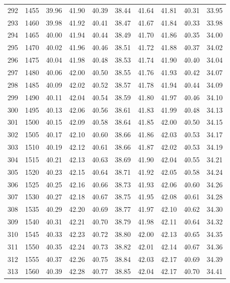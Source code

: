 \begin{longtable}{rrllllllll}
292 & 1455 & 39.96 & 41.90 & 40.39 & 38.44 & 41.64 & 41.81 & 40.31 & 33.95 \\ 
293 & 1460 & 39.98 & 41.92 & 40.41 & 38.47 & 41.67 & 41.84 & 40.33 & 33.98 \\ 
294 & 1465 & 40.00 & 41.94 & 40.44 & 38.49 & 41.70 & 41.86 & 40.35 & 34.00 \\ 
295 & 1470 & 40.02 & 41.96 & 40.46 & 38.51 & 41.72 & 41.88 & 40.37 & 34.02 \\ 
296 & 1475 & 40.04 & 41.98 & 40.48 & 38.53 & 41.74 & 41.90 & 40.40 & 34.04 \\ 
297 & 1480 & 40.06 & 42.00 & 40.50 & 38.55 & 41.76 & 41.93 & 40.42 & 34.07 \\ 
298 & 1485 & 40.09 & 42.02 & 40.52 & 38.57 & 41.78 & 41.94 & 40.44 & 34.09 \\ 
299 & 1490 & 40.11 & 42.04 & 40.54 & 38.59 & 41.80 & 41.97 & 40.46 & 34.10 \\ 
300 & 1495 & 40.13 & 42.06 & 40.56 & 38.61 & 41.83 & 41.99 & 40.48 & 34.13 \\ 
301 & 1500 & 40.15 & 42.09 & 40.58 & 38.64 & 41.85 & 42.00 & 40.50 & 34.15 \\ 
302 & 1505 & 40.17 & 42.10 & 40.60 & 38.66 & 41.86 & 42.03 & 40.53 & 34.17 \\ 
303 & 1510 & 40.19 & 42.12 & 40.61 & 38.66 & 41.87 & 42.02 & 40.53 & 34.19 \\ 
304 & 1515 & 40.21 & 42.13 & 40.63 & 38.69 & 41.90 & 42.04 & 40.55 & 34.21 \\ 
305 & 1520 & 40.23 & 42.15 & 40.64 & 38.71 & 41.92 & 42.05 & 40.58 & 34.24 \\ 
306 & 1525 & 40.25 & 42.16 & 40.66 & 38.73 & 41.93 & 42.06 & 40.60 & 34.26 \\ 
307 & 1530 & 40.27 & 42.18 & 40.67 & 38.75 & 41.95 & 42.08 & 40.61 & 34.28 \\ 
308 & 1535 & 40.29 & 42.20 & 40.69 & 38.77 & 41.97 & 42.10 & 40.62 & 34.30 \\ 
309 & 1540 & 40.31 & 42.21 & 40.70 & 38.79 & 41.98 & 42.11 & 40.64 & 34.32 \\ 
310 & 1545 & 40.33 & 42.23 & 40.72 & 38.80 & 42.00 & 42.13 & 40.65 & 34.35 \\ 
311 & 1550 & 40.35 & 42.24 & 40.73 & 38.82 & 42.01 & 42.14 & 40.67 & 34.36 \\ 
312 & 1555 & 40.37 & 42.26 & 40.75 & 38.84 & 42.03 & 42.17 & 40.69 & 34.39 \\ 
313 & 1560 & 40.39 & 42.28 & 40.77 & 38.85 & 42.04 & 42.17 & 40.70 & 34.41 \\ 

\end{longtable}
